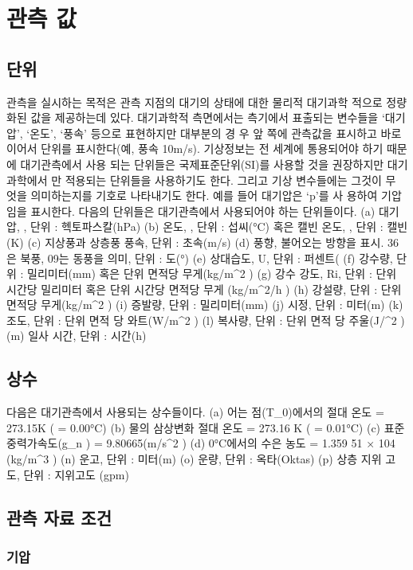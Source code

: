 \section{관측 값}
\subsection{단위}

관측을 실시하는 목적은 관측 지점의 대기의 상태에 대한 물리적 대기과학
적으로 정량화된 값을 제공하는데 있다. 대기과학적 측면에서는 측기에서
표출되는 변수들을 ‘대기압’, ‘온도’, ‘풍속’ 등으로 표현하지만 대부분의 경
우 앞 쪽에 관측값을 표시하고 바로 이어서 단위를 표시한다(예, 풍속
10m/s). 기상정보는 전 세계에 통용되어야 하기 때문에 대기관측에서 사용
되는 단위들은 국제표준단위(SI)를 사용할 것을 권장하지만 대기과학에서
만 적용되는 단위들을 사용하기도 한다. 그리고 기상 변수들에는 그것이 무
엇을 의미하는지를 기호로 나타내기도 한다. 예를 들어 대기압은 ‘p’를 사
용하여 기압임을 표시한다.
다음의 단위들은 대기관측에서 사용되어야 하는 단위들이다.
(a) 대기압, , 단위 : 헥토파스칼(hPa)
(b) 온도, , 단위 : 섭씨(°C) 혹은 캘빈 온도, , 단위 : 캘빈(K)
(c) 지상풍과 상층풍 풍속, 단위 : 초속(m/s)
(d) 풍향, 불어오는 방향을 표시. 36은 북풍, 09는 동풍을 의미, 단위 : 도(°)
(e) 상대습도, U, 단위 : 퍼센트(%
(f) 강수량, 단위 : 밀리미터(mm) 혹은 단위 면적당 무게(kg/m^2 )
(g) 강수 강도, Ri, 단위 : 단위 시간당 밀리미터 혹은 단위 시간당 면적당
무게 (kg/m^2/h )
(h) 강설량, 단위 : 단위 면적당 무게(kg/m^2 )
(i) 증발량, 단위 : 밀리미터(mm)
(j) 시정, 단위 : 미터(m)
(k) 조도, 단위 : 단위 면적 당 와트(W/m^2 )
(l) 복사량, 단위 : 단위 면적 당 주울(J/^2 )
(m) 일사 시간, 단위 : 시간(h)

\subsection{상수}
다음은 대기관측에서 사용되는 상수들이다.
(a) 어는 점(T_0)에서의 절대 온도 = 273.15K ( = 0.00°C)
(b) 물의 삼상변화 절대 온도 = 273.16 K ( = 0.01°C)
(c) 표준 중력가속도(g_n ) = 9.80665(m/s^2 )
(d) 0°C에서의 수은 농도 = 1.359 51 × 104 (kg/m^3 )
(n) 운고, 단위 : 미터(m)
(o) 운량, 단위 : 옥타(Oktas)
(p) 상층 지위 고도, 단위 : 지위고도 (gpm)

\subsection{관측 자료 조건}
\subsubsection{기압}

